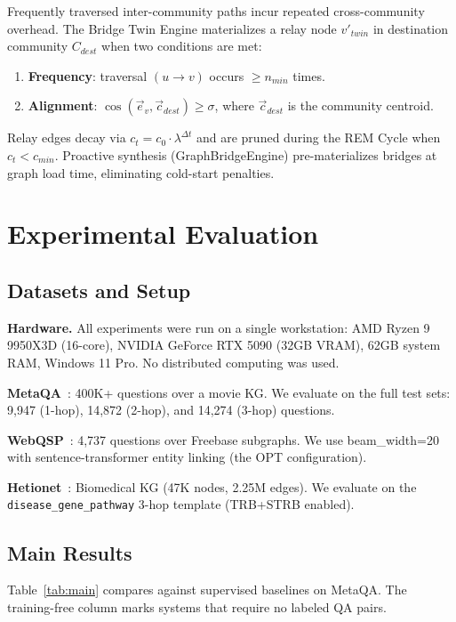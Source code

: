 \documentclass[10pt,twocolumn]{article}
\begin{document}
Frequently traversed inter-community paths incur repeated cross-community overhead. The
Bridge Twin Engine materializes a relay node $v'_{twin}$ in destination community $C_{dest}$
when two conditions are met:
\begin{enumerate}
  \item \textbf{Frequency}: traversal $(u \to v)$ occurs $\geq n_{min}$ times.
  \item \textbf{Alignment}: $\cos(\vec{e}_v, \vec{c}_{dest}) \geq \sigma$, where
        $\vec{c}_{dest}$ is the community centroid.
\end{enumerate}

Relay edges decay via $c_t = c_0 \cdot \lambda^{\Delta t}$ and are pruned during the
REM Cycle when $c_t < c_{min}$. Proactive synthesis (GraphBridgeEngine) pre-materializes
bridges at graph load time, eliminating cold-start penalties.

\section{Experimental Evaluation}
\label{sec:experiments}

\subsection{Datasets and Setup}

\textbf{Hardware.} All experiments were run on a single workstation:
AMD Ryzen 9 9950X3D (16-core), NVIDIA GeForce RTX 5090 (32GB VRAM), 62GB system RAM,
Windows 11 Pro. No distributed computing was used.

\textbf{MetaQA}~\cite{metaqa2017}: 400K+ questions over a movie KG.
We evaluate on the full test sets: 9,947 (1-hop), 14,872 (2-hop), and 14,274 (3-hop) questions.

\textbf{WebQSP}~\cite{webqsp2016}: 4,737 questions over Freebase subgraphs.
We use beam\_width=20 with sentence-transformer entity linking (the OPT configuration).

\textbf{Hetionet}~\cite{hetionet2017}: Biomedical KG (47K nodes, 2.25M edges).
We evaluate on the \texttt{disease\_gene\_pathway} 3-hop template (TRB+STRB enabled).

\subsection{Main Results}

Table~\ref{tab:main} compares \CEREBRUM{} against supervised baselines on MetaQA.
The training-free column marks systems that require no labeled QA pairs.
\end{document}
